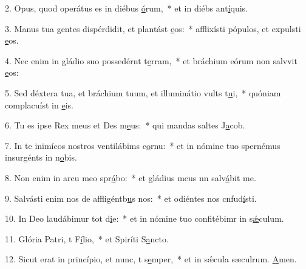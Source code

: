 2. Opus, quod operátus es in diébus \uline{ó}rum,~* et in diébs ant\uline{í}quis.\par 
3. Manus tua gentes dispérdidit, et plantást \uline{e}os:~* afflixísti pópulos, et expulsti \uline{e}os.\par 
4. Nec enim in gládio suo possedérnt t\uline{e}rram,~* et bráchium eórum non salvvit \uline{e}os:\par 
5. Sed déxtera tua, et bráchium tuum, et illuminátio vults t\uline{u}i,~* quóniam complacuíst in \uline{e}is.\par 
6. Tu es ipse Rex meus et Des m\uline{e}us:~* qui mandas saltes J\uline{a}cob.\par 
7. In te inimícos nostros ventilábims c\uline{o}rnu:~* et in nómine tuo spernémus insurgénts in n\uline{o}bis.\par 
8. Non enim in arcu meo spr\uline{á}bo:~* et gládius meus nn salv\uline{á}bit me.\par 
9. Salvásti enim nos de affligéntb\uline{u}s nos:~* et odiéntes nos cnfud\uline{í}sti.\par 
10. In Deo laudábimur tot d\uline{i}e:~* et in nómine tuo confitébimr in s\uline{ǽ}culum.\par 
11. Glória Patri, t F\uline{í}lio,~* et Spiríti S\uline{a}ncto.\par 
12. Sicut erat in princípio, et nunc, t s\uline{e}mper,~* et in sǽcula sæculrum. \uline{A}men.\par 
